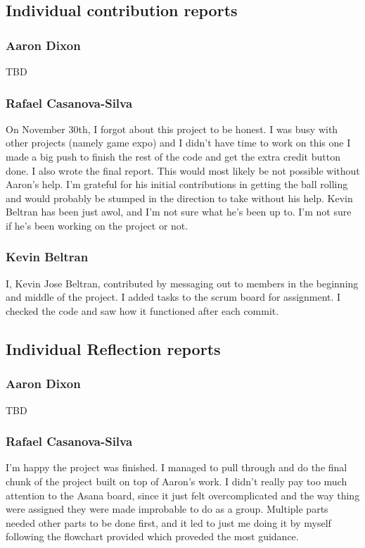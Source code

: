 \documentclass[11pt]{article}
\begin{document}
\subsection{Individual contribution reports}

\subsubsection{Aaron Dixon}
TBD
\subsubsection{Rafael Casanova-Silva}
On November 30th, I forgot about this project to be honest. I was busy with other projects (namely game expo) and I didn't have time to work on this one
I made a big push to finish the rest of the code and get the extra credit button done. I also wrote the final report. This would most likely
be not possible without Aaron's help. I'm grateful for his initial contributions in getting the ball rolling and would probably be stumped in
the direction to take without his help. Kevin Beltran has been just awol, and I'm not sure what he's been up to. I'm not sure if he's been working on the project or not.
\subsubsection{Kevin Beltran}
I, Kevin Jose Beltran, contributed by messaging out to members in the beginning and middle of the project. 
I added tasks to the scrum board for assignment. I checked the code and saw how it functioned after each commit.

\subsection{Individual Reflection reports}

\subsubsection{Aaron Dixon}
TBD
\subsubsection{Rafael Casanova-Silva}
I'm happy the project was finished. I managed to pull through and do the final chunk of the project built on top of Aaron's work. I didn't really pay too much attention to the
Asana board, since it just felt overcomplicated and the way thing were assigned they were made improbable to do as a group. Multiple parts needed other parts to be done first, and
it led to just me doing it by myself following the flowchart provided which proveded the most guidance.
\end{document}
